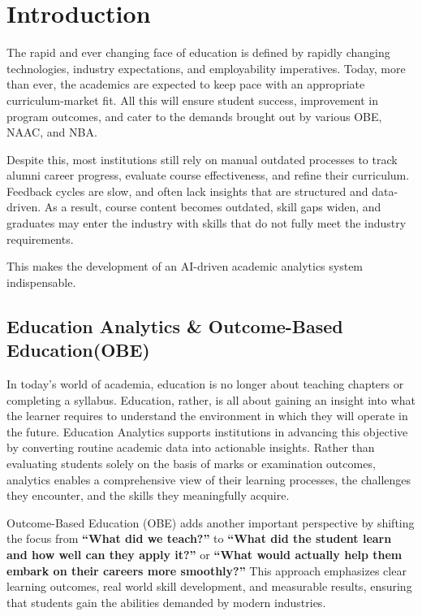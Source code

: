 \chapter{Introduction}
\label{Chapter:Introduction}

The rapid and ever changing face of education is defined by rapidly changing technologies, industry expectations, and employability imperatives. Today, more than ever, the academics are expected to keep pace with an appropriate curriculum-market fit. All this will ensure student success, improvement in program outcomes, and cater to the demands brought out by various OBE, NAAC, and NBA.

Despite this, most institutions still rely on manual outdated processes to track alumni career progress, evaluate course effectiveness, and refine their curriculum. Feedback cycles are slow, and often lack insights that are structured and data-driven. As a result, course content becomes outdated, skill gaps widen, and graduates may enter the industry with skills that do not fully meet the industry requirements.

This makes the development of an AI-driven academic analytics system indispensable.

\section{Education Analytics \& Outcome-Based Education(OBE)}
In today's world of academia, education is no longer about teaching chapters or completing a syllabus. Education, rather, is all about gaining an insight into what the learner requires to understand the environment in which they will operate in the future. Education Analytics supports institutions in advancing this objective by converting routine academic data into actionable insights. Rather than evaluating students solely on the basis of marks or examination outcomes, analytics enables a comprehensive view of their learning processes, the challenges they encounter, and the skills they meaningfully acquire.

Outcome-Based Education (OBE) adds another important perspective by shifting the focus from \textbf{``What did we teach?''} to \textbf{``What did the student learn and how well can they apply it?''} or \textbf{``What would actually help them embark on their careers more smoothly?''} This approach emphasizes clear learning outcomes, real world skill development, and measurable results, ensuring that students gain the abilities demanded by modern industries.

